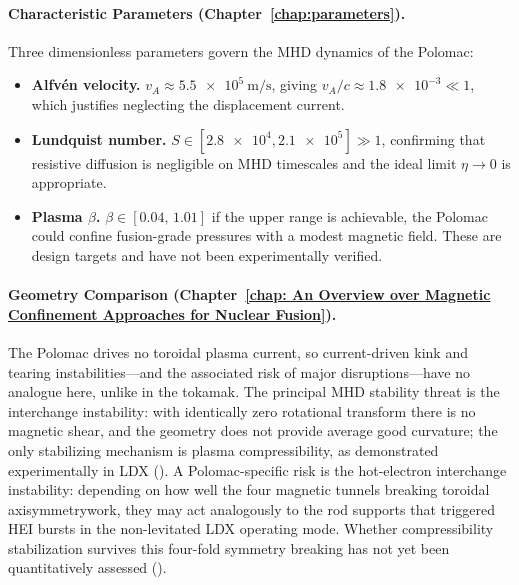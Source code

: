 \paragraph{Characteristic Parameters (Chapter~\ref{chap:parameters}).}
Three dimensionless parameters govern the MHD dynamics of the Polomac:
\begin{itemize}
  \item \textbf{Alfvén velocity.}
        $v_A \approx \SI{5.5e5}{\meter\per\second}$, giving
        $v_A/c\approx\num{1.8e-3}\ll 1$, which justifies neglecting the
        displacement current.
  \item \textbf{Lundquist number.}
        $S\in[\num{2.8e4}, \num{2.1e5}]\gg 1$, confirming that resistive
        diffusion is negligible on MHD timescales and the ideal limit $\eta\to 0$
        is appropriate.
  \item \textbf{Plasma \texorpdfstring{$\beta$}{Beta}.}
        $\beta\in[0.04,\,1.01]$ if the upper range is achievable, the Polomac
        could confine fusion-grade pressures with a modest magnetic field.
        These are design targets and have not been experimentally verified.
\end{itemize}

\paragraph{Geometry Comparison (Chapter~\ref{chap: An Overview over Magnetic Confinement Approaches for Nuclear Fusion}).}
The Polomac drives no toroidal plasma current, so current-driven kink and tearing
instabilities—and the associated risk of major disruptions—have no analogue here,
unlike in the tokamak.
The principal MHD stability threat is the interchange instability: with identically zero
rotational transform there is no magnetic shear, and the geometry does not 
provide average good curvature; the only stabilizing mechanism is plasma 
compressibility, as demonstrated experimentally in LDX (\cite{Garnier2006}).
A Polomac-specific risk is the hot-electron interchange instability: depending on how well the four magnetic
tunnels breaking toroidal axisymmetrywork, they may act analogously to the rod supports that
triggered HEI bursts in the non-levitated LDX operating mode.
Whether compressibility stabilization survives this four-fold symmetry breaking has not
yet been quantitatively assessed (\cite{Elio2024}).

